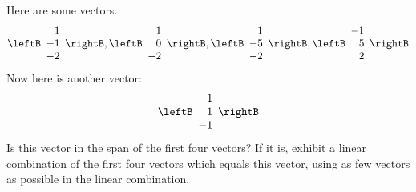 \begin{enumialphparenastyle}
\begin{ex} Here are some vectors. 
\begin{equation*}
\leftB 
\begin{array}{r}
1 \\ 
-1 \\ 
-2
\end{array}
\rightB ,\leftB 
\begin{array}{r}
1 \\ 
0 \\ 
-2
\end{array}
\rightB ,\leftB 
\begin{array}{r}
1 \\ 
-5 \\ 
-2
\end{array}
\rightB ,\leftB 
\begin{array}{r}
-1 \\ 
5 \\ 
2
\end{array}
\rightB
\end{equation*}
Now here is another vector:\ 
\begin{equation*}
\leftB 
\begin{array}{r}
1 \\ 
1 \\ 
-1
\end{array}
\rightB 
\end{equation*}
Is this vector in the span of the first four vectors? If it is, exhibit a
linear combination of the first four vectors which equals this vector, using
as few vectors as possible in the linear combination. 
\end{ex}


\end{enumialphparenastyle}
